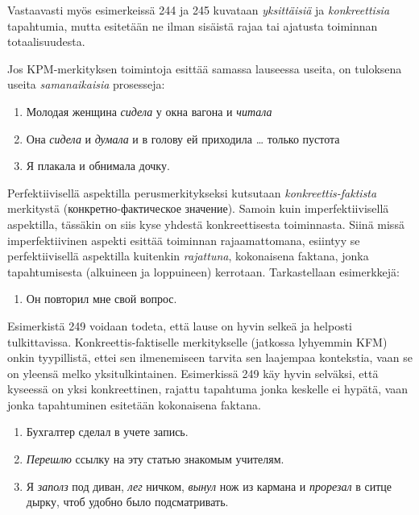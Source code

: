 \documentclass[]{scrreprt}
\providecommand{\tightlist}{%
  \setlength{\itemsep}{0pt}\setlength{\parskip}{0pt}}
\begin{document}
Vastaavasti myös esimerkeissä 244 ja 245 kuvataan \emph{yksittäisiä} ja
\emph{konkreettisia} tapahtumia, mutta esitetään ne ilman sisäistä rajaa
tai ajatusta toiminnan totaalisuudesta.

Jos KPM-merkityksen toimintoja esittää samassa lauseessa useita, on
tuloksena useita \emph{samanaikaisia} prosesseja:

\begin{enumerate}
\def\labelenumi{(\arabic{enumi})}
\setcounter{enumi}{245}
\tightlist
\item
  Молодая женщина \emph{сидела} у окна вагона и \emph{читала}
\item
  Она \emph{сидела} и \emph{думала} и в голову ей приходила \ldots{}
  только пустота
\item
  Я плакала и обнимала дочку.
\end{enumerate}

Perfektiivisellä aspektilla perusmerkitykseksi kutsutaan
\emph{konkreettis-faktista} merkitystä (конкретно-фактическое значение).
Samoin kuin imperfektiivisellä aspektilla, tässäkin on siis kyse yhdestä
konkreettisesta toiminnasta. Siinä missä imperfektiivinen aspekti
esittää toiminnan rajaamattomana, esiintyy se perfektiivisellä
aspektilla kuitenkin \emph{rajattuna}, kokonaisena faktana, jonka
tapahtumisesta (alkuineen ja loppuineen) kerrotaan. Tarkastellaan
esimerkkejä:

\begin{enumerate}
\def\labelenumi{(\arabic{enumi})}
\setcounter{enumi}{248}
\tightlist
\item
  Он повторил мне свой вопрос.
\end{enumerate}

Esimerkistä 249 voidaan todeta, että lause on hyvin selkeä ja helposti
tulkittavissa. Konkreettis-faktiselle merkitykselle (jatkossa lyhyemmin
KFM) onkin tyypillistä, ettei sen ilmenemiseen tarvita sen laajempaa
kontekstia, vaan se on yleensä melko yksitulkintainen. Esimerkissä 249
käy hyvin selväksi, että kyseessä on yksi konkreettinen, rajattu
tapahtuma jonka keskelle ei hypätä, vaan jonka tapahtuminen esitetään
kokonaisena faktana.

\begin{enumerate}
\def\labelenumi{(\arabic{enumi})}
\setcounter{enumi}{249}
\tightlist
\item
  Бухгалтер сделал в учете запись.
\item
  \emph{Перешлю} ссылку на эту статью знакомым учителям.
\item
  Я \emph{заполз} под диван, \emph{лег} ничком, \emph{вынул} нож из
  кармана и \emph{прорезал} в ситце дырку, чтоб удобно было
  подсматривать.
\end{enumerate}
\end{document}
